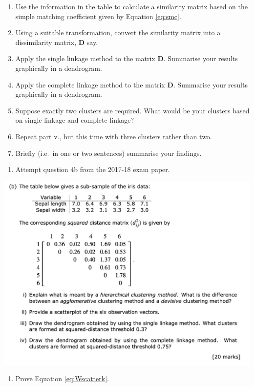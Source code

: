 \documentclass[
]{book}
\providecommand{\tightlist}{%
  \setlength{\itemsep}{0pt}\setlength{\parskip}{0pt}}
\theoremstyle{definition}
\theoremstyle{definition}
\theoremstyle{definition}
\theoremstyle{definition}
\theoremstyle{remark}
\begin{document}
\begin{enumerate}
\def\labelenumi{\roman{enumi}.}
\item
  Use the information in the table to calculate a similarity matrix based on the simple matching
  coefficient given by Equation \eqref{eq:smc}.
\item
  Using a suitable transformation, convert the similarity matrix into a dissimilarity matrix,
  \(\mathbf D\) say.
\item
  Apply the single linkage method to the matrix \(\mathbf D\). Summarise your results graphically in a dendrogram.
\item
  Apply the complete linkage method to the matrix \(\mathbf D\). Summarise your results graphically in a dendrogram.
\item
  Suppose exactly two clusters are required. What would be your clusters based on single
  linkage and complete linkage?
\item
  Repeat part v., but this time with three clusters rather than two.
\item
  Briefly (i.e.~in one or two sentences) summarise your findings.
\end{enumerate}

\begin{enumerate}
\def\labelenumi{\arabic{enumi}.}
\setcounter{enumi}{2}
\tightlist
\item
  Attempt question 4b from the 2017-18 exam paper.
\end{enumerate}

\includegraphics{figs/Clustering_2017_18.png}

\begin{enumerate}
\def\labelenumi{\arabic{enumi}.}
\setcounter{enumi}{3}
\tightlist
\item
  Prove Equation \eqref{eq:Wscatterk}.
\end{enumerate}
\end{document}
